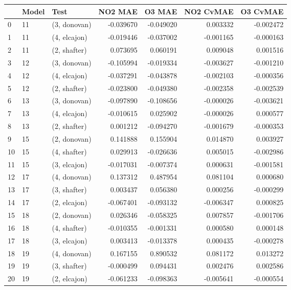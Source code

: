 \begin{tabular}{lllrrrr}
\toprule
{} & Model &          Test &   NO2 MAE &    O3 MAE &  NO2 CvMAE &  O3 CvMAE \\
\midrule
0  &    11 &  (3, donovan) & -0.039670 & -0.049020 &   0.003332 & -0.002472 \\
1  &    11 &  (4, elcajon) & -0.019446 & -0.037002 &  -0.001165 & -0.000163 \\
2  &    11 &  (2, shafter) &  0.073695 &  0.060191 &   0.009048 &  0.001516 \\
3  &    12 &  (3, donovan) & -0.105994 & -0.019334 &  -0.003627 & -0.001210 \\
4  &    12 &  (4, elcajon) & -0.037291 & -0.043878 &  -0.002103 & -0.000356 \\
5  &    12 &  (2, shafter) & -0.023800 & -0.049380 &  -0.002358 & -0.002539 \\
6  &    13 &  (3, donovan) & -0.097890 & -0.108656 &  -0.000026 & -0.003621 \\
7  &    13 &  (4, elcajon) & -0.010615 &  0.025902 &  -0.000026 &  0.000577 \\
8  &    13 &  (2, shafter) &  0.001212 & -0.094270 &  -0.001679 & -0.000353 \\
9  &    15 &  (2, donovan) &  0.141888 &  0.155904 &   0.014870 &  0.003927 \\
10 &    15 &  (4, shafter) &  0.029913 & -0.026636 &   0.005015 & -0.002986 \\
11 &    15 &  (3, elcajon) & -0.017031 & -0.007374 &   0.000631 & -0.001581 \\
12 &    17 &  (4, donovan) &  0.137312 &  0.487954 &   0.081104 &  0.000680 \\
13 &    17 &  (3, shafter) &  0.003437 &  0.056380 &   0.000256 & -0.000299 \\
14 &    17 &  (2, elcajon) & -0.067401 & -0.093132 &  -0.006347 &  0.000825 \\
15 &    18 &  (2, donovan) &  0.026346 & -0.058325 &   0.007857 & -0.001706 \\
16 &    18 &  (4, shafter) & -0.010355 & -0.001331 &   0.000580 &  0.000148 \\
17 &    18 &  (3, elcajon) &  0.003413 & -0.013378 &   0.000435 & -0.000278 \\
18 &    19 &  (4, donovan) &  0.167155 &  0.890532 &   0.081172 &  0.013272 \\
19 &    19 &  (3, shafter) & -0.000499 &  0.094431 &   0.002476 &  0.002586 \\
20 &    19 &  (2, elcajon) & -0.061233 & -0.098363 &  -0.005641 & -0.000554 \\

\end{tabular}
